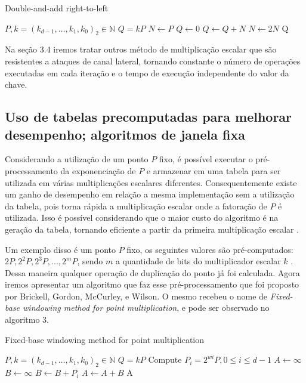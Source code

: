 \begin{algorithm}[H]
\caption{Double-and-add right-to-left}
\begin{algorithmic} 
    \REQUIRE $P, k=(k_{d-1},\ldots,k_1,k_0)_2 \in \mathbb{N}$
    \ENSURE $Q = kP$
    \STATE $N \leftarrow P$
    \STATE $Q \leftarrow 0$
            \STATE $Q \leftarrow Q + N$
        \ENDIF
        \STATE $N \leftarrow 2N$
    \ENDFOR
    \RETURN Q
    \end{algorithmic}
\end{algorithm}

Na seção 3.4 iremos tratar outros método de multiplicação escalar que são resistentes a ataques de canal lateral, tornando constante o número de operações executadas em cada iteração e o tempo de execução independente do valor da chave.

\subsection{Uso de tabelas precomputadas para melhorar desempenho; algoritmos de janela fixa}
Considerando a utilização de um ponto $P$ fixo, é possível executar o pré-processamento da exponenciação de $P$ e armazenar em uma tabela para ser utilizada em várias multiplicações escalares diferentes. Consequentemente existe um ganho de desempenho em relação a mesma implementação sem a utilização da tabela, pois torna rápida a multiplicação escalar onde a fatoração de $P$ é utilizada. Isso é possível considerando que o maior custo do algoritmo é na geração da tabela, tornando eficiente a partir da primeira multiplicação escalar \cite{Hankerson:2003:GEC:940321}.

Um exemplo disso é um ponto $P$ fixo, os seguintes valores são pré-computados: $2P, 2^2P, 2^3P,..., 2^mP$, sendo $m$ a quantidade de bits do multiplicador escalar $k$ \cite{Hankerson:2003:GEC:940321}. Dessa maneira qualquer operação de duplicação do ponto já foi calculada. Agora iremos apresentar um algoritmo que faz esse pré-processamento que foi proposto por Brickell, Gordon, McCurley, e Wilson. O mesmo recebeu o nome de \textit{Fixed-base windowing method for point multiplication}, e pode ser observado no algoritmo 3.

\renewcommand{\algorithmicforall}{\textbf{for each}}

\begin{algorithm}[H]
\caption{Fixed-base windowing method for point multiplication}
\begin{algorithmic} 
    \REQUIRE $P, k=(k_{d-1},\ldots,k_1,k_0)_2 \in \mathbb{N}$
    \ENSURE $Q = kP$
    \STATE Compute $P_i = 2^{wi}P, 0 \le i \le d-1$
    \STATE $A \leftarrow \infty$
    \STATE $B \leftarrow \infty$
            \STATE $B \leftarrow B + P_i$
            \STATE $A \leftarrow A + B$
        \ENDFOR
    \ENDFOR
    \RETURN A
    \end{algorithmic}
\end{algorithm}


